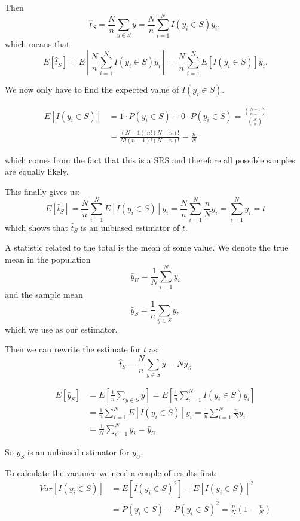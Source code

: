 \documentclass{article}
\begin{document}
Then $$ \hat{t}_S = \frac{N}{n} \sum_{y \in S} y = \frac{N}{n} \sum_{i = 1}^{N}
I(y_i \in S) y_i ,$$
which means that
$$ E \left[ \hat{t}_S \right] = E \left[ \frac{N}{n} \sum_{i = 1}^{N}
  I(y_i \in S) y_i \right] =
\frac{N}{n} \sum_{i = 1}^{N}
E\left[ I(y_i \in S) \right] y_i .$$

We now only have to find the expected value of $I(y_i \in S)$.

\begin{align*}
  E \left[ I(y_i \in S) \right]
  &= 1 \cdot P(y_i \in S) + 0 \cdot P(y_i \in S)
    = \frac{\binom{N - 1}{n - 1}}{\binom{N}{n}} \\
  &= \frac{(N - 1)! n! (N - n)!}{N! (n - 1)! (N - n)!}
    = \frac{n}{N}
\end{align*}

which comes from the fact that this is a SRS and therefore all possible samples
are equally likely.

This finally gives us:
$$
E \left[ \hat{t}_S \right]
= \frac{N}{n} \sum_{i = 1}^{N} E\left[ I(y_i \in S) \right] y_i
= \frac{N}{n} \sum_{i = 1}^{N} \frac{n}{N} y_i
= \sum_{i = 1}^{N} y_i
= t
$$
which shows that $\hat{t}_S$ is an unbiased estimator of $t$.


A statistic related to the total is the mean of some value. We denote the true
mean in the population
$$\bar{y}_U = \frac{1}{N} \sum_{i = 1}^{N} y_i$$
and the sample mean
$$\bar{y}_S = \frac{1}{n} \sum_{y \in S} y ,$$
which we use as our estimator.

Then we can rewrite the estimate for $t$ as:
$$ \hat{t}_S = \frac{N}{n} \sum_{y \in S} y = N\bar{y}_S $$

\begin{align*}
E \left[ \bar{y}_S \right]
&= E \left[ \frac{1}{n} \sum_{y \in S} y \right]
= E \left[ \frac{1}{n} \sum_{i = 1}^N I(y_i \in S) y_i \right] \\
&= \frac{1}{n} \sum_{i = 1}^N E \left[ I(y_i \in S) \right] y_i
= \frac{1}{n} \sum_{i = 1}^N \frac{n}{N} y_i \\
&= \frac{1}{N} \sum_{i = 1}^N y_i
= \bar{y}_U
\end{align*}

So $\bar{y}_S$ is an unbiased estimator for $\bar{y}_U$.

To calculate the variance we need a couple of results first:
\begin{align*}
  Var \left[ I(y_i \in S) \right]
  &= E \left[ I(y_i \in S)^2 \right] - E \left[
  I(y_i \in S) \right]^2 \\
  &= P(y_i \in S) - P(y_i \in S)^2
  = \frac{n}{N}(1 - \frac{n}{N})
\end{align*}
\end{document}
